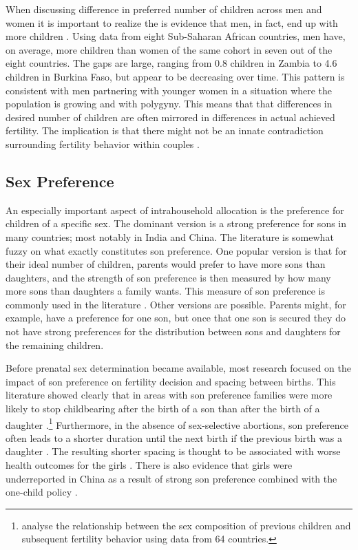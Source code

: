 \documentclass[]{article}
\begin{document}
When discussing difference in preferred number of children across men and women it is important to realize the is evidence that men, in fact, end up with more children \citep{Field2016}. Using data from eight Sub-Saharan African countries, men have, on average, more children than women of the same cohort in seven out of the eight countries. The gaps are large, ranging from 0.8 children in Zambia to 4.6 children in Burkina Faso, but appear to be decreasing over time. This pattern is consistent with men partnering with younger women in a situation where the population is growing and with polygyny. This means that that differences in desired number of children are often mirrored in differences in actual achieved fertility. The implication is that there might not be an innate contradiction surrounding fertility behavior within couples \citep{Field2016}.

\subsection{Sex Preference}\label{sex-preference}

An especially important aspect of intrahousehold allocation is the preference for children of a specific sex. The dominant version is a strong preference for sons in many countries; most notably in India and China. The literature is somewhat fuzzy on what exactly constitutes son preference. One popular version is that for their ideal number of children, parents would prefer to have more sons than daughters, and the strength of son preference is then measured by how many more sons than daughters a family wants. This measure of son preference is commonly used in the literature \citep[See, for example,]{clark00,Jensen2009,Hu2015}. Other versions are possible. Parents might, for example, have a preference for one son, but once that one son is secured they do not have strong preferences for the distribution between sons and daughters for the remaining children.

Before prenatal sex determination became available, most research focused on the impact of son preference on fertility decision and spacing between births. This literature showed clearly that in areas with son preference families were more likely to stop childbearing after the birth of a son than after the birth of a daughter \citep[see, for example,][]{Das1987,Arnold1997,clark00}.\footnote{\citet{filmer09} analyse the relationship between the sex composition of previous children and subsequent fertility behavior using data from 64 countries.} Furthermore, in the absence of sex-selective abortions, son preference often leads to a shorter duration until the next birth if the previous birth was a daughter \citep[see, for example,][]{Das1987,Rahman1993,Pong1994,Haughton1996,Arnold1997}. The resulting shorter spacing is thought to be associated with worse health outcomes for the girls \citep{arnold98,Whitworth2002,Rutstein2005,Conde-Agudelo2006}. There is also evidence that girls were underreported in China as a result of strong son preference combined with the one-child policy \citep{Merli2000}.
\end{document}

